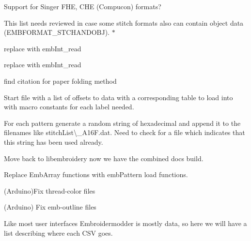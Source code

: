 \begin{DoxyRefList}
\label{todo__todo000188}%
%
Support for Singer FHE, CHE (Compucon) formats? 
\item[Member \mbox{\hyperlink{formats_8c_a8cb11404ce46501561f956d33f8dcf95}{format\+Table}} \mbox{[}number\+Of\+Formats\mbox{]}]\label{todo__todo000213}%
%
This list needs reviewed in case some stitch formats also can contain object data (EMBFORMAT\+\_\+\+STCHANDOBJ). $\ast$  
\item[Member \mbox{\hyperlink{formats_8c_a05fb50e7292226bc2947dd2b4da7a9bd}{fread\+\_\+int32\+\_\+be}} (FILE $\ast$f)]\label{todo__todo000215}%
%
replace with emb\+Int\+\_\+read  
\item[Member \mbox{\hyperlink{formats_8c_a2bcdb1e6bf6930d5c054ecdca9831eba}{fread\+\_\+uint16}} (FILE $\ast$f)]\label{todo__todo000214}%
%
replace with emb\+Int\+\_\+read  
\item[Member \mbox{\hyperlink{fill_8c_ad02b5d945eacff708d2bf084c40044d8}{generate\+\_\+dragon\+\_\+curve}} (char $\ast$state, int iterations)]\label{todo__todo000208}%
%
find citation for paper folding method  
\item[Page \mbox{\hyperlink{geometry-and-algorithms}{Geometry and Algorithms}} ]\label{todo__todo000197}%
%
Start file with a list of offsets to data with a corresponding table to load into with macro constants for each label needed.

\label{todo__todo000198}%
%
For each pattern generate a random string of hexadecimal and append it to the filenames like {\ttfamily stitch\+List\textbackslash{}\+\_\+\+A16\+F.\+dat}. Need to check for a file which indicates that this string has been used already.

\label{todo__todo000199}%
%
Move back to libembroidery now we have the combined docs build.

\label{todo__todo000196}%
%
Replace Emb\+Array functions with emb\+Pattern load functions.

\label{todo__todo000190}%
%
(Arduino)Fix thread-\/color files

\label{todo__todo000189}%
%
(Arduino) Fix emb-\/outline files

\label{todo__todo000195}%
%
Like most user interfaces Embroidermodder is mostly data, so here we will have a list describing where each CSV goes.


\end{DoxyRefList}
